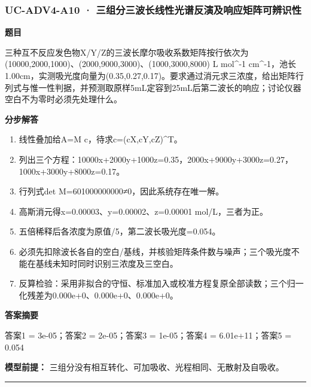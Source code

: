 \documentclass[UTF8,11pt,a4paper]{ctexart}
\begin{document}
\subsubsection*{UC-ADV4-A10 · 三组分三波长线性光谱反演及响应矩阵可辨识性}
\noindent\textbf{题目}\par
三种互不反应发色物X/Y/Z的三波长摩尔吸收系数矩阵按行依次为(10000,2000,1000)、(2000,9000,3000)、(1000,3000,8000) L mol\textasciicircum{}-1 cm\textasciicircum{}-1，池长1.00cm，实测吸光度向量为(0.35,0.27,0.17)。要求通过消元求三浓度，给出矩阵行列式与惟一性判据，并预测取原样5mL定容到25mL后第二波长的响应；讨论仪器空白不为零时必须先处理什么。\par
\medskip\noindent\textbf{分步解答}
\begin{enumerate}
\item 线性叠加给A=M c，待求c=(cX,cY,cZ)\textasciicircum{}T。
\item 列出三个方程：10000x+2000y+1000z=0.35，2000x+9000y+3000z=0.27，1000x+3000y+8000z=0.17。
\item 行列式det M=601000000000≠0，因此系统存在唯一解。
\item 高斯消元得x=0.00003、y=0.00002、z=0.00001 mol/L，三者为正。
\item 五倍稀释后各浓度为原值/5，第二波长吸光度=0.054。
\item 必须先扣除波长各自的空白/基线，并核验矩阵条件数与噪声；三个吸光度不能在基线未知时同时识别三浓度及三空白。
\item 反算检验：采用非拟合的守恒、标准加入或校准方程复原全部读数；三个归一化残差为0.000e+0、0.000e+0、0.000e+0。
\end{enumerate}
\noindent\textbf{答案摘要}\par
答案1 = 3e-05；答案2 = 2e-05；答案3 = 1e-05；答案4 = 6.01e+11；答案5 = 0.054\par
\noindent\textbf{模型前提：}
三组分没有相互转化、可加吸收、光程相同、无散射及自吸收。\par
\medskip\hrule\medskip
{}
\end{document}
